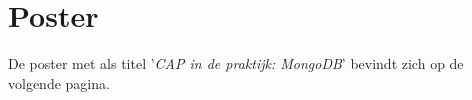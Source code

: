 \chapter{Poster}\label{sec:poster}
De poster met als titel '\textit{CAP in de praktijk: MongoDB}' bevindt zich op de volgende pagina. 
